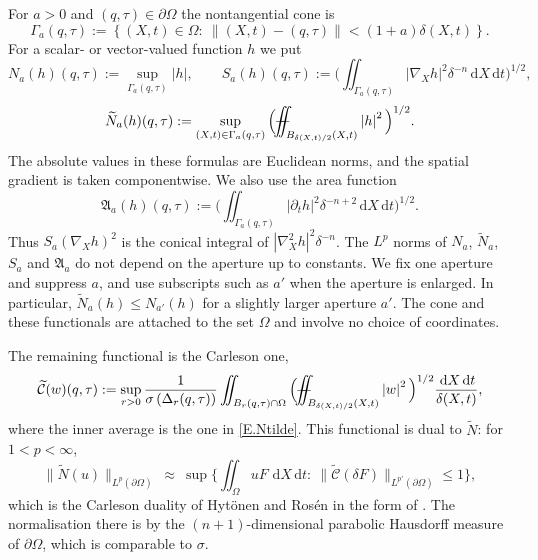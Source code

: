 \documentclass[10pt,a4paper]{amsart}
\numberwithin{equation}{section}
\newcommand{\wt}{\widetilde}
\newcommand{\abs}[1]{\left\vert#1\right\vert}
\newcommand{\br}[1]{\left(#1\right)}
\newcommand{\set}[1]{\left\{#1\right\}}
\newcommand{\om}{\Omega}
\newcommand{\pom}{\partial\Omega}
\newcommand{\pd}{\partial}
\newcommand{\Nt}{\widetilde N}
\newcommand{\Gam}{\Gamma}
\renewcommand{\d}{\,\mathrm d}
\def\Yint#1{\mathchoice
	{\YYint\displaystyle\textstyle{#1}}%
	{\YYint\textstyle\scriptstyle{#1}}%
	{\YYint\scriptstyle\scriptscriptstyle{#1}}%
	{\YYint\scriptscriptstyle\scriptscriptstyle{#1}}%
	\!\dint}
\newcommand{\dint}{\int\!\!\!\!\!\int}
\def\YYint#1#2#3{{\setbox0=\hbox{$#1{#2#3}{\iint}$}
		\vcenter{\hbox{$#2#3$}}\kern-.51\wd0}}
\def\longdash{\mkern-1.5mu{-}\mkern-7.5mu{-}}
\def\fiint{\Yint\longdash}
\begin{document}
\noindent For $a>0$ and $(q,\tau)\in\pom$ the nontangential cone is
\begin{equation}\label{E.cone}
  \Gam_a(q,\tau):=\set{(X,t)\in\om:\ \big\|(X,t)-(q,\tau)\big\|
   <(1+a)\delta(X,t)} .
\end{equation}
\noindent For a scalar- or vector-valued function $h$ we put
\begin{equation}\label{E.functionals}
  N_a(h)(q,\tau):=\sup_{\Gam_a(q,\tau)}\abs h,\qquad
  S_a(h)(q,\tau):=\Big(\iint_{\Gam_a(q,\tau)}\abs{\nabla_Xh}^2\delta^{-n}\d X\d t
   \Big)^{1/2},
\end{equation}
\begin{equation}\label{E.Ntilde}
  \Nt_a(h)(q,\tau):=\sup_{(X,t)\in\Gam_a(q,\tau)}
   \Big(\fiint_{B_{\delta(X,t)/2}(X,t)}\abs h^2\Big)^{1/2} .
\end{equation}
The absolute values in these formulas are Euclidean norms, and the spatial
gradient is taken componentwise. We also use the area function
\begin{equation}\label{E.areafun}
 \mathfrak A_a(h)(q,\tau):=
 \Big(\iint_{\Gam_a(q,\tau)}\abs{\pd_th}^2
       \delta^{-n+2}\d X\d t\Big)^{1/2}.
\end{equation}
Thus $S_a(\nabla_Xh)^2$ is the conical integral of
$\abs{\nabla^2_Xh}^2\delta^{-n}$. The $L^p$ norms of $N_a$, $\Nt_a$, $S_a$
and $\mathfrak A_a$ do not depend on the aperture up to constants. We fix one
aperture and suppress $a$, and use subscripts such as $a'$ when the aperture
is enlarged. In particular, $\Nt_a(h)\le N_{a'}(h)$ for a slightly larger
aperture $a'$. The cone and these functionals are attached to the set $\om$
and involve no choice of coordinates.

\noindent The remaining functional is the Carleson one,
\begin{equation}\label{E.carlfun}
  \wt{\mathcal C}(w)(q,\tau):=\sup_{r>0}\frac1{\sigma\br{\Delta_r(q,\tau)}}
  \iint_{B_r(q,\tau)\cap\om}
   \Big(\fiint_{B_{\delta(X,t)/2}(X,t)}\abs w^2\Big)^{1/2}
   \frac{\d X\d t}{\delta(X,t)} ,
\end{equation}
where the inner average is the one in \eqref{E.Ntilde}. This functional is
dual to $\Nt$: for
$1<p<\infty$,
\begin{equation}\label{E.carlduality}
  \big\|\Nt(u)\big\|_{L^p(\pom)}\ \approx\
  \sup\Big\{\iint_\om uF\,\d X\d t:\ \big\|\wt{\mathcal C}(\delta F)
   \big\|_{L^{p'}(\pom)}\le1\Big\} ,
\end{equation}
which is the Carleson duality of Hyt\"onen and Ros\'en \cite{HR} in the form of
\cite[Lemma 2.8]{DLP2}. The normalisation there is by the $(n+1)$-dimensional
parabolic Hausdorff measure of $\pom$, which is comparable to $\sigma$.
\end{document}
